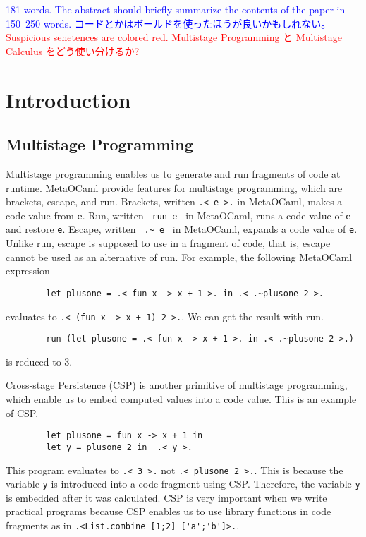 \documentclass[runningheads]{llncs}
\newcommand{\red}[1]{\textcolor{red}{#1 }}
\newcommand{\blue}[1]{\textcolor{blue}{#1 }}
\begin{document}
\blue{181 words. The abstract should briefly summarize the contents of the paper in 150--250 words.}
\blue{コードとかはボールドを使ったほうが良いかもしれない。}
\red{Suspicious senetences are colored red.}
%
%
%
\red{Multistage Programming と Multistage Calculus をどう使い分けるか?}

\section{Introduction}

\subsection{Multistage Programming}


Multistage programming enables us to generate and run fragments of code at runtime.
MetaOCaml\cite{oleg2014} provide features for multistage programming, which are brackets, escape, and run.
Brackets, written \verb|.< e >.| in MetaOCaml, makes a code value from \verb|e|.
Run, written \verb| run e | in MetaOCaml, runs a code value of \verb|e| and restore \verb|e|.
Escape, written \verb| .~ e | in MetaOCaml, expands a code value of \verb|e|.
Unlike run, escape is supposed to use in a fragment of code, that is, escape cannot be used as an alternative of run.
For example, the following MetaOCaml expression

\begin{verbatim}
        let plusone = .< fun x -> x + 1 >. in .< .~plusone 2 >.
\end{verbatim}
evaluates to \verb|.< (fun x -> x + 1) 2 >.|. We can get the result with run.
\begin{verbatim}
        run (let plusone = .< fun x -> x + 1 >. in .< .~plusone 2 >.)
\end{verbatim}
is reduced to 3.


Cross-stage Persistence (CSP) is another primitive of multistage programming, which enable us to embed computed values into a code value.
This is an example of CSP.
\begin{verbatim}
        let plusone = fun x -> x + 1 in
        let y = plusone 2 in  .< y >.
\end{verbatim}
This program evaluates to \verb|.< 3 >.| not  \verb|.< plusone 2 >.|.
This is because the variable \verb|y| is introduced into a code fragment using CSP.
Therefore, the variable \verb|y| is embedded after it was calculated.
CSP is very important when we write practical programs 
because CSP enables us to use library functions in code fragments as in \verb|.<List.combine [1;2] ['a';'b']>.|.
\end{document}
